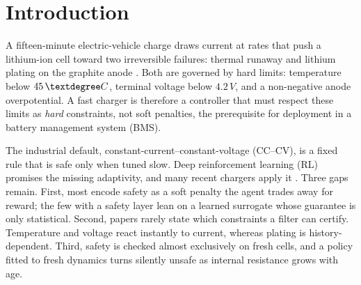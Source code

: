 \documentclass[conference]{IEEEtran}
\newcommand{\SI}[2]{#1\,#2}
\newcommand{\degreeCelsius}{\textdegree C}
\begin{document}
\section{Introduction}
A fifteen-minute electric-vehicle charge draws current at rates that push a lithium-ion cell toward
two irreversible failures: thermal runaway and lithium plating on the graphite anode
\cite{tomaszewska2019,waldmann2014}. Both are governed by hard limits: temperature below
$\SI{45}{\degreeCelsius}$, terminal voltage below $\SI{4.2}{V}$, and a non-negative anode
overpotential. A fast charger is therefore a controller that must respect these limits as \emph{hard}
constraints, not soft penalties, the prerequisite for deployment in a battery management system
(BMS).

The industrial default, constant-current--constant-voltage (CC--CV), is a fixed rule that is safe only
when tuned slow. Deep reinforcement learning (RL) promises the missing adaptivity, and many recent
chargers apply it \cite{iecon2022penalty,cao2025adaptive,attia2020}. Three gaps remain. First, most
encode safety as a soft penalty the agent trades away for reward; the few with a safety layer lean on
a learned surrogate whose guarantee is only statistical. Second, papers rarely state which constraints
a filter can certify. Temperature and voltage react instantly to current, whereas plating is
history-dependent. Third, safety is checked almost exclusively on fresh cells, and a policy fitted to
fresh dynamics turns silently unsafe as internal resistance grows with age.
\end{document}
